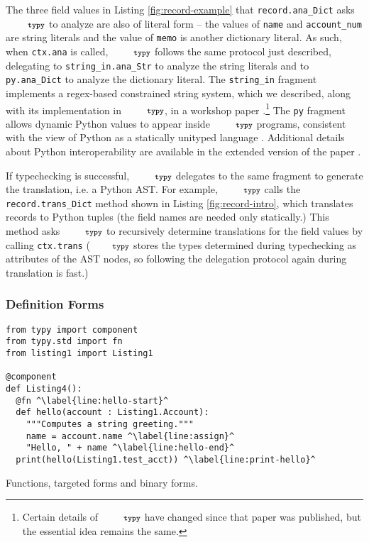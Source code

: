 \documentclass[10pt]{sigplanconf}
\newif\ifext
\newcommand{\typy}{\texttt{\footnotesize typy}}
\newcommand{\lip}[1]{\lstinline[language=Python,basicstyle=\ttfamily\footnotesize,morekeywords={with},deletendkeywords={tuple,buffer,map}]{#1}}
\newcommand{\li}[1]{\lip{#1}}
\begin{document}
The three field values in Listing \ref{fig:record-example} that \li{record.ana_Dict} asks $\typy$ to analyze are also of literal form -- the values of \li{name} and \li{account_num} are string literals and the value of \li{memo} is another dictionary literal. As such, when \li{ctx.ana} is called, $\typy$ follows the same protocol just described, delegating to \li{string_in.ana_Str} to analyze the string literals and to \li{py.ana_Dict} to analyze the dictionary literal. The \li{string_in} fragment implements a regex-based constrained string system, which we described, along with its implementation in $\typy$, in a workshop paper \cite{sanitation-psp14}.\footnote{Certain details of $\typy$ have changed since that paper was published, but the essential idea remains the same.} The \li{py} fragment allows dynamic Python values to appear inside $\typy$ programs, consistent with the view of Python as a statically unityped language \cite{scott1980lambda,pfpl}. 
Additional details about Python interoperability are available in \ifext Appendix \ref{appendix:py}. \else the extended version of the paper \cite{gpce16tr}.\fi

If typechecking is successful, $\typy$ delegates to the same fragment to generate the translation, i.e. a Python AST. For example, $\typy$ calls the \li{record.trans_Dict} method shown in Listing \ref{fig:record-intro}, which translates records to Python tuples (the field names are needed only statically.) 
This method asks $\typy$ to recursively determine translations for the field values by calling \li{ctx.trans} ($\typy$ stores the types determined during typechecking as attributes of the AST nodes, so following the delegation protocol again during translation is fast.)

\subsubsection{Definition Forms}\label{sec:fns}
\begin{codelisting}[t]
\vspace{-3px}
\begin{lstlisting}
from typy import component
from typy.std import fn
from listing1 import Listing1

@component
def Listing4():
  @fn ^\label{line:hello-start}^
  def hello(account : Listing1.Account):
    """Computes a string greeting."""
    name = account.name ^\label{line:assign}^
    "Hello, " + name ^\label{line:hello-end}^
  print(hello(Listing1.test_acct)) ^\label{line:print-hello}^
\end{lstlisting}
\caption{Functions, targeted forms and binary forms.}
\label{fig:hello}
\end{codelisting}
\end{document}
